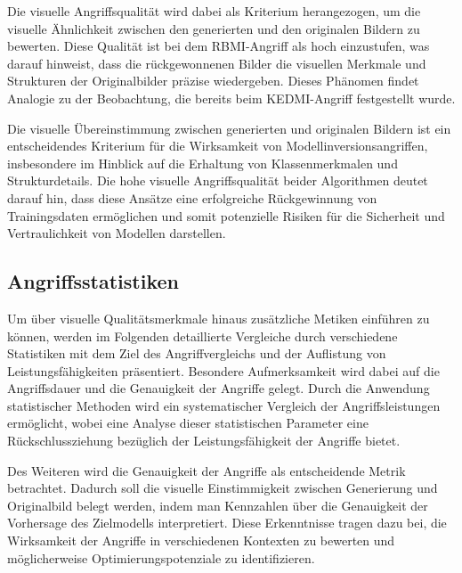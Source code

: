 Die visuelle Angriffsqualität wird dabei als Kriterium herangezogen, um die visuelle Ähnlichkeit zwischen den generierten und den originalen Bildern zu bewerten. Diese Qualität ist bei dem \glqq RBMI\grqq-Angriff als hoch einzustufen, was darauf hinweist, dass die rückgewonnenen Bilder die visuellen Merkmale und Strukturen der Originalbilder präzise wiedergeben. Dieses Phänomen findet Analogie zu der Beobachtung, die bereits beim \glqq KEDMI\grqq-Angriff festgestellt wurde.

Die visuelle Übereinstimmung zwischen generierten und originalen Bildern ist ein entscheidendes Kriterium für die Wirksamkeit von Modellinversionsangriffen, insbesondere im Hinblick auf die Erhaltung von Klassenmerkmalen und Strukturdetails. Die hohe visuelle Angriffsqualität beider Algorithmen deutet darauf hin, dass diese Ansätze eine erfolgreiche Rückgewinnung von Trainingsdaten ermöglichen und somit potenzielle Risiken für die Sicherheit und Vertraulichkeit von Modellen darstellen.
\subsection{Angriffsstatistiken}
Um über visuelle Qualitätsmerkmale hinaus zusätzliche Metiken einführen zu können, werden im Folgenden detaillierte Vergleiche durch verschiedene Statistiken mit dem Ziel des Angriffvergleichs und der Auflistung von Leistungsfähigkeiten präsentiert. Besondere Aufmerksamkeit wird dabei auf die Angriffsdauer und die Genauigkeit der Angriffe gelegt. Durch die Anwendung statistischer Methoden wird ein systematischer Vergleich der Angriffsleistungen ermöglicht, wobei eine Analyse dieser statistischen Parameter eine Rückschlussziehung bezüglich der Leistungsfähigkeit der Angriffe bietet.

Des Weiteren wird die Genauigkeit der Angriffe als entscheidende Metrik betrachtet. Dadurch soll die visuelle Einstimmigkeit zwischen Generierung und Originalbild belegt werden, indem man Kennzahlen über die Genauigkeit der Vorhersage des Zielmodells interpretiert. Diese Erkenntnisse tragen dazu bei, die Wirksamkeit der Angriffe in verschiedenen Kontexten zu bewerten und möglicherweise Optimierungspotenziale zu identifizieren.

\begin{table}[h]
	\centering
	\renewcommand{\arraystretch}{1.5}
	\caption{\glqq KEDMI\grqq-Angriffsstatistik}
	\label{tab:kedmi_stats}
\end{table}

